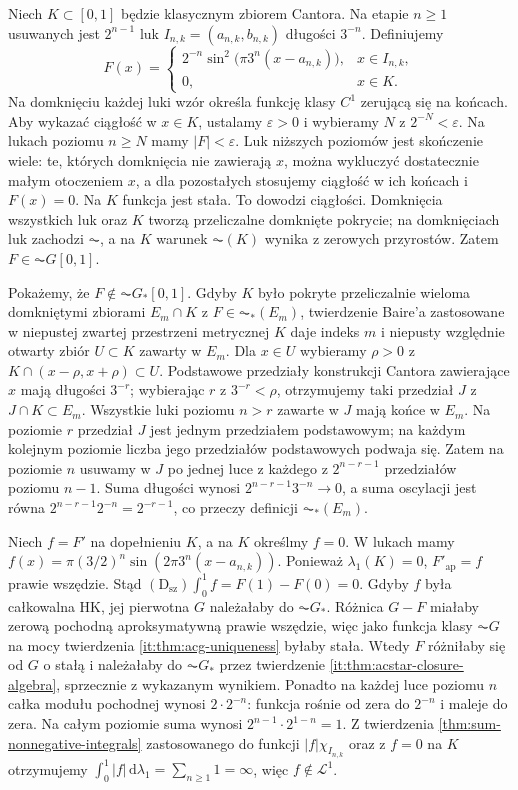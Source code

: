 \begin{przyklad}\label{ma1:kh:ex:denjoy-strict}\label{it:ex:broad-denjoy-strict}
Niech $K\subset[0,1]$ będzie klasycznym zbiorem Cantora. Na etapie $n\ge1$ usuwanych jest $2^{n-1}$ luk $I_{n,k}=(a_{n,k},b_{n,k})$ długości $3^{-n}$. Definiujemy
\[
F(x)=\begin{cases}
2^{-n}\sin^2\!\bigl(\pi3^n(x-a_{n,k})\bigr),&x\in I_{n,k},\\
0,&x\in K.
\end{cases}
\]
Na domknięciu każdej luki wzór określa funkcję klasy $C^1$ zerującą się na końcach. Aby wykazać ciągłość w $x\in K$, ustalamy $\varepsilon>0$ i wybieramy $N$ z $2^{-N}<\varepsilon$. Na lukach poziomu $n\ge N$ mamy $|F|<\varepsilon$. Luk niższych poziomów jest skończenie wiele: te, których domknięcia nie zawierają $x$, można wykluczyć dostatecznie małym otoczeniem $x$, a dla pozostałych stosujemy ciągłość w ich końcach i $F(x)=0$. Na $K$ funkcja jest stała. To dowodzi ciągłości. Domknięcia wszystkich luk oraz $K$ tworzą przeliczalne domknięte pokrycie; na domknięciach luk zachodzi $\AC$, a na $K$ warunek $\AC(K)$ wynika z zerowych przyrostów. Zatem $F\in\AC G[0,1]$.

Pokażemy, że $F\notin\AC G_*[0,1]$. Gdyby $K$ było pokryte przeliczalnie wieloma domkniętymi zbiorami $E_m\cap K$ z $F\in\AC_*(E_m)$, twierdzenie Baire'a zastosowane w niepustej zwartej przestrzeni metrycznej $K$ daje indeks $m$ i niepusty względnie otwarty zbiór $U\subset K$ zawarty w $E_m$. Dla $x\in U$ wybieramy $\rho>0$ z $K\cap(x-\rho,x+\rho)\subset U$. Podstawowe przedziały konstrukcji Cantora zawierające $x$ mają długości $3^{-r}$; wybierając $r$ z $3^{-r}<\rho$, otrzymujemy taki przedział $J$ z $J\cap K\subset E_m$. Wszystkie luki poziomu $n>r$ zawarte w $J$ mają końce w $E_m$. Na poziomie $r$ przedział $J$ jest jednym przedziałem podstawowym; na każdym kolejnym poziomie liczba jego przedziałów podstawowych podwaja się. Zatem na poziomie $n$ usuwamy w $J$ po jednej luce z każdego z $2^{n-r-1}$ przedziałów poziomu $n-1$. Suma długości wynosi $2^{n-r-1}3^{-n}\to0$, a suma oscylacji jest równa $2^{n-r-1}2^{-n}=2^{-r-1}$, co przeczy definicji $\AC_*(E_m)$.

Niech $f=F'$ na dopełnieniu $K$, a na $K$ określmy $f=0$. W lukach mamy
$f(x)=\pi(3/2)^n\sin(2\pi3^n(x-a_{n,k}))$.
Ponieważ $\lambda_1(K)=0$, $F'_{\mathrm{ap}}=f$ prawie wszędzie. Stąd $(\mathrm D_{\mathrm{sz}})\int_0^1 f=F(1)-F(0)=0$. Gdyby $f$ była całkowalna HK, jej pierwotna $G$ należałaby do $\AC G_*$. Różnica $G-F$ miałaby zerową pochodną aproksymatywną prawie wszędzie, więc jako funkcja klasy $\AC G$ na mocy twierdzenia \ref{it:thm:acg-uniqueness} byłaby stała. Wtedy $F$ różniłaby się od $G$ o stałą i należałaby do $\AC G_*$ przez twierdzenie \ref{it:thm:acstar-closure-algebra}, sprzecznie z wykazanym wynikiem. Ponadto na każdej luce poziomu $n$ całka modułu pochodnej wynosi $2\cdot2^{-n}$: funkcja rośnie od zera do $2^{-n}$ i maleje do zera. Na całym poziomie suma wynosi $2^{n-1}\cdot2^{1-n}=1$. Z twierdzenia \ref{thm:sum-nonnegative-integrals} zastosowanego do funkcji $|f|\chi_{I_{n,k}}$ oraz z $f=0$ na $K$ otrzymujemy $\int_0^1|f|\,\mathrm d\lambda_1=\sum_{n\ge1}1=\infty$, więc $f\notin\mathcal L^1$.
\end{przyklad}
